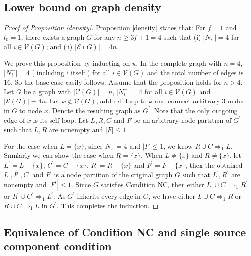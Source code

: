 \documentclass[letterpaper, 11pt]{article}
\newcommand{\calE}{{\mathcal{E}}}
\newcommand{\calV}{{\mathcal{V}}}
\begin{document}
\subsection{Lower bound on graph density}
\begin{proof}[Proof of Proposition \ref{density}]
Proposition \ref{density} states that: For $f=1$ and $l_0=1$, there exists a graph $G$ for any $n\ge 3f+1=4$ such that
(i) $|N_i^{-}|=4$ for all $i\in \calV(G)$; and
(ii) $|\calE(G)|=4n$.

We prove this proposition by inducting on $n$.
In the complete graph with $n=4$, $|N_i^{-}|=4$ ( including $i$ itself ) for all $i\in \calV(G)$ and the total number of edges is $16$. So the base case easily follows. Assume that the proposition holds for $n>4$. Let $G$ be a graph with $|\calV(G)|=n$,  $|N_i^{-}|=4$ for all $i\in \calV(G)$ and $|\calE(G)|=4n$. Let $x\notin \calV(G)$, add self-loop to $x$ and connect arbitrary $3$ nodes in $G$ to node $x$. Denote the resulting graph as $G^{\prime}$. Note that the only outgoing edge of $x$ is its self-loop.  Let $L, R, C$ and $F$ be an arbitrary node partition of $G^{\prime}$ such that $L, R$ are nonempty and $|F|\le 1$.


For the case when $L=\{x\}$, since $N_x^{-}=4$ and $|F|\le 1$, we know $R\cup C\Rightarrow_1 L$. Similarly we can show the case when $R=\{x\}$. When $L\not=\{x\}$ and $R\not=\{x\}$, let $L^{\prime}=L-\{x\}$, $C^{\prime}=C-\{x\}$, $R^{\prime}=R-\{x\}$ and $F^{\prime}=F-\{x\}$, then the obtained $L^{\prime}, R^{\prime}, C^{\prime}$ and $F^{\prime}$ is a node partition of the original graph $G$ such that $L^{\prime}, R^{\prime}$ are nonempty and $|F^{\prime}|\le 1$. Since $G$ satisfies Condition NC, then either $L^{\prime}\cup C^{\prime}\Rightarrow_1 R^{\prime}$ or $R^{\prime}\cup C^{\prime}\Rightarrow_1 L^{\prime}$. As $G^{\prime}$ inherits every edge in $G$, we have either $L\cup C\Rightarrow_1 R$ or $R\cup C\Rightarrow_1 L$ in $G^{\prime}$. This completes the induction.
\end{proof}







\subsection{Equivalence of Condition NC and single source component condition}\label{app:equi}
\end{document}
